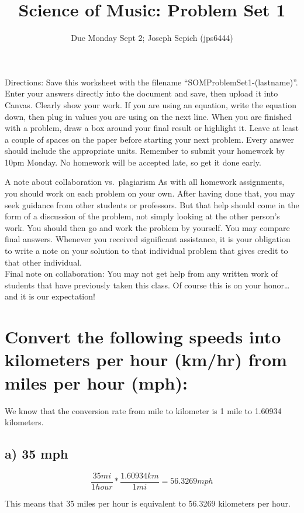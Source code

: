 \documentclass[]{article}
\title{Science of Music: Problem Set 1}
\subtitle{Due Monday Sept 2; Joseph Sepich (jps6444)}
\author{}
\date{}
\begin{document}
\maketitle

Directions: Save this worksheet with the filename
``SOMProblemSet1-(lastname)''. Enter your answers directly into the
document and save, then upload it into Canvas. Clearly show your work.
If you are using an equation, write the equation down, then plug in
values you are using on the next line. When you are finished with a
problem, draw a box around your final result or highlight it. Leave at
least a couple of spaces on the paper before starting your next problem.
Every answer should include the appropriate units. Remember to submit
your homework by 10pm Monday. No homework will be accepted late, so get
it done early.

A note about collaboration vs.~plagiarism As with all homework
assignments, you should work on each problem on your own. After having
done that, you may seek guidance from other students or professors. But
that help should come in the form of a discussion of the problem, not
simply looking at the other person's work. You should then go and work
the problem by yourself. You may compare final answers. Whenever you
received significant assistance, it is your obligation to write a note
on your solution to that individual problem that gives credit to that
other individual.\\
Final note on collaboration: You may not get help from any written work
of students that have previously taken this class. Of course this is on
your honor\ldots{}and it is our expectation!

\section{Convert the following speeds into kilometers per hour (km/hr)
from miles per hour
(mph):}\label{convert-the-following-speeds-into-kilometers-per-hour-kmhr-from-miles-per-hour-mph}

We know that the conversion rate from mile to kilometer is 1 mile to
1.60934 kilometers.

\subsection{a) 35 mph}\label{a-35-mph}

\[\frac{35 mi}{1 hour} * \frac{1.60934 km}{1 mi} = 56.3269 mph\]

This means that 35 miles per hour is equivalent to 56.3269 kilometers
per hour.
\end{document}
